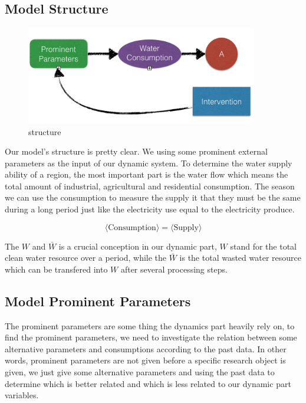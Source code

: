   \subsection{Model Structure}

    \begin{figure}[!h]
    \includegraphics[width = 0.9\textwidth]{picture/struct.png}
    \caption{structure}
    \label{fig: structure}
    \end{figure}
    Our model's structure is pretty clear.
    We using some prominent external parameters as the input of our dynamic system. To determine the water supply ability of a region, the most important part is the water flow which means the total amount of industrial, agricultural and residential consumption. The season we can use the consumption to measure the supply it that they must be the same during a long period just like the electricity use equal to the electricity produce.

    $$
    \langle \text{Consumption}\rangle = \langle \text{Supply} \rangle
    $$

    The $W$ and $\bar{W}$ is a crucial conception in our dynamic part, $W$ stand for the total clean water resource over a period, while the $\bar{W}$ is the total wasted water resource which can be transfered into $W$ after several processing steps.

  \subsection{Model Prominent Parameters}

    The prominent parameters are some thing the dynamics part heavily rely on, to find the prominent parameters, we need to investigate the relation between some alternative parameters and consumptions according to the past data. In other words, prominent parameters are not given before a specific research object is given, we just give some alternative parameters and using the past data to determine which is better related and which is less related to our dynamic part variables.

